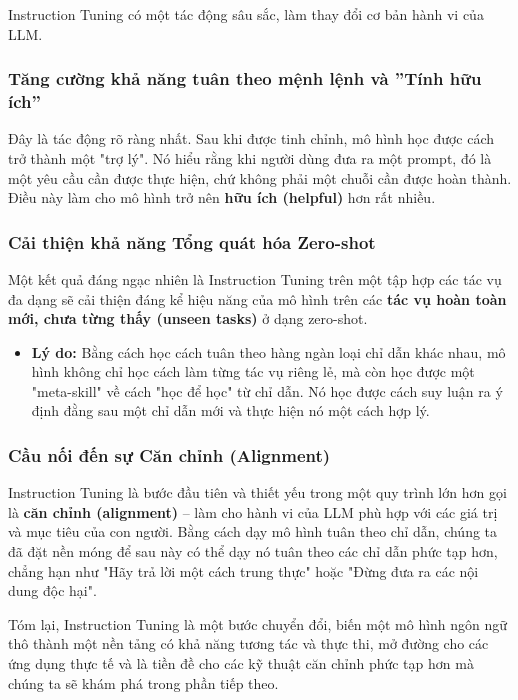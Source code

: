 Instruction Tuning có một tác động sâu sắc, làm thay đổi cơ bản hành vi của LLM.

\subsubsection{Tăng cường khả năng tuân theo mệnh lệnh và ''Tính hữu ích''}
Đây là tác động rõ ràng nhất. Sau khi được tinh chỉnh, mô hình học được cách trở thành một "trợ lý". Nó hiểu rằng khi người dùng đưa ra một prompt, đó là một yêu cầu cần được thực hiện, chứ không phải một chuỗi cần được hoàn thành. Điều này làm cho mô hình trở nên \textbf{hữu ích (helpful)} hơn rất nhiều.

\subsubsection{Cải thiện khả năng Tổng quát hóa Zero-shot}
Một kết quả đáng ngạc nhiên là Instruction Tuning trên một tập hợp các tác vụ đa dạng sẽ cải thiện đáng kể hiệu năng của mô hình trên các \textbf{tác vụ hoàn toàn mới, chưa từng thấy (unseen tasks)} ở dạng zero-shot.
\begin{itemize}
    \item \textbf{Lý do:} Bằng cách học cách tuân theo hàng ngàn loại chỉ dẫn khác nhau, mô hình không chỉ học cách làm từng tác vụ riêng lẻ, mà còn học được một "meta-skill" về cách "học để học" từ chỉ dẫn. Nó học được cách suy luận ra ý định đằng sau một chỉ dẫn mới và thực hiện nó một cách hợp lý.
\end{itemize}

\subsubsection{Cầu nối đến sự Căn chỉnh (Alignment)}
Instruction Tuning là bước đầu tiên và thiết yếu trong một quy trình lớn hơn gọi là \textbf{căn chỉnh (alignment)} -- làm cho hành vi của LLM phù hợp với các giá trị và mục tiêu của con người. Bằng cách dạy mô hình tuân theo chỉ dẫn, chúng ta đã đặt nền móng để sau này có thể dạy nó tuân theo các chỉ dẫn phức tạp hơn, chẳng hạn như "Hãy trả lời một cách trung thực" hoặc "Đừng đưa ra các nội dung độc hại".

Tóm lại, Instruction Tuning là một bước chuyển đổi, biến một mô hình ngôn ngữ thô thành một nền tảng có khả năng tương tác và thực thi, mở đường cho các ứng dụng thực tế và là tiền đề cho các kỹ thuật căn chỉnh phức tạp hơn mà chúng ta sẽ khám phá trong phần tiếp theo.